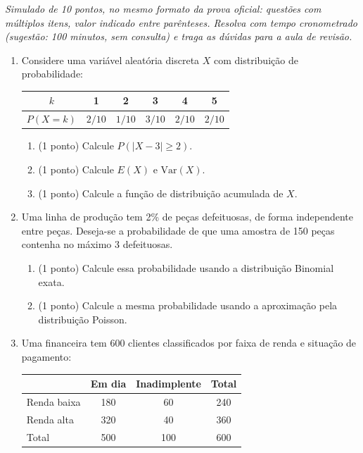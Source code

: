 \documentclass[11pt]{article}
\begin{document}

\noindent \textit{Simulado de 10 pontos, no mesmo formato da prova oficial: questões com múltiplos
itens, valor indicado entre parênteses. Resolva com tempo cronometrado (sugestão: 100 minutos,
sem consulta) e traga as dúvidas para a aula de revisão.}

\begin{enumerate}

\item Considere uma variável aleatória discreta $X$ com distribuição de probabilidade:
\begin{center}
\begin{tabular}{c|ccccc}
\toprule
$k$ & 1 & 2 & 3 & 4 & 5 \\
\midrule
$P(X=k)$ & $2/10$ & $1/10$ & $3/10$ & $2/10$ & $2/10$ \\
\bottomrule
\end{tabular}
\end{center}
\begin{enumerate}
  \item (1 ponto) Calcule $P(|X-3|\ge 2)$.
  \item (1 ponto) Calcule $E(X)$ e $\mathrm{Var}(X)$.
  \item (1 ponto) Calcule a função de distribuição acumulada de $X$.
\end{enumerate}

\item Uma linha de produção tem 2\% de peças defeituosas, de forma independente entre peças.
Deseja-se a probabilidade de que uma amostra de 150 peças contenha no máximo 3 defeituosas.
\begin{enumerate}
  \item (1 ponto) Calcule essa probabilidade usando a distribuição Binomial exata.
  \item (1 ponto) Calcule a mesma probabilidade usando a aproximação pela distribuição Poisson.
\end{enumerate}

\item Uma financeira tem 600 clientes classificados por faixa de renda e situação de pagamento:

\begin{center}
\begin{tabular}{l|cc|c}
\toprule
 & Em dia & Inadimplente & Total \\
\midrule
Renda baixa & 180 & 60 & 240 \\
Renda alta  & 320 & 40 & 360 \\
\midrule
Total       & 500 & 100 & 600 \\
\bottomrule
\end{tabular}
\end{center}


\end{enumerate}
\end{document}
